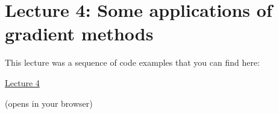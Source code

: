 \section{Lecture 4: Some applications of gradient methods}

This lecture was a sequence of code examples that you can find here:

\begin{center}
{\Large
\href{https://ee227c.github.io/code/lecture4.html}{Lecture 4}
}

(opens in your browser)
\end{center}


